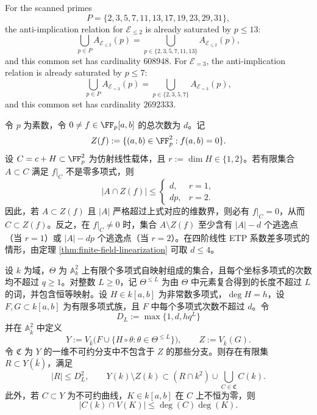 \begin{theorem}\label{thm:prime-field-saturation}
For the scanned primes
\[
    P=\{2,3,5,7,11,13,17,19,23,29,31\},
\]
the anti-implication relation for \({\mathcal E}_{\leq 2}\) is already
saturated by \(p\leq 13\):
\[
    \bigcup_{p\in P} A_{{\mathcal E}_{\leq 2}}(p)
    =
    \bigcup_{p\in\{2,3,5,7,11,13\}} A_{{\mathcal E}_{\leq 2}}(p),
\]
and this common set has cardinality \(608948\).  For
\({\mathcal E}_{=3}\), the anti-implication relation is already saturated by
\(p\leq 7\):
\[
    \bigcup_{p\in P} A_{{\mathcal E}_{=3}}(p)
    =
    \bigcup_{p\in\{2,3,5,7\}} A_{{\mathcal E}_{=3}}(p),
\]
and this common set has cardinality \(2692333\).
\end{theorem}
\begin{proposition}[系数平面载体的逃逸或陷落判据]\label{prop:distill-finite-field-carrier-escape-trap}
令 \(p\) 为素数，令 \(0\neq f\in\FF_p[a,b]\) 的总次数为 \(d\)。记
\[
Z(f):=\{(a,b)\in\FF_p^2:f(a,b)=0\}.
\]
设 \(C=c+H\subset\FF_p^2\) 为仿射线性载体，且 \(r:=\dim H\in\{1,2\}\)。若有限集合 \(A\subset C\) 满足 \(f|_C\) 不是零多项式，则
\[
|A\cap Z(f)|\leq
\begin{cases}
d,& r=1,\\
dp,& r=2.
\end{cases}
\]
因此，若 \(A\subset Z(f)\) 且 \(|A|\) 严格超过上式对应的维数界，则必有 \(f|_C=0\)，从而 \(C\subset Z(f)\)。反之，在 \(f|_C\neq 0\) 时，集合 \(A\setminus Z(f)\) 至少含有 \(|A|-d\) 个逃逸点（当 \(r=1\)）或 \(|A|-dp\) 个逃逸点（当 \(r=2\)）。在四阶线性 ETP 系数差多项式的情形，由定理 \ref{thm:finite-field-linearization} 可取 \(d\leq 4\)。
\end{proposition}
\begin{lemma}[系数平面的拉回逃逸骨架引理]\label{distill:breuillard_green_tao_approximate_groups_and_helfgott_growth-escape_and_algebraic_obstruction_control-coefficient-plane-pullback-bezout-skeleton}
设 \(k\) 为域，\(\Theta\) 为 \(\mathbb A^2_k\) 上有限个多项式自映射组成的集合，且每个坐标多项式的次数均不超过 \(q\ge 1\)。对整数 \(L\ge0\)，记 \(\Theta^{\le L}\) 为由 \(\Theta\) 中元素复合得到的长度不超过 \(L\) 的词，并包含恒等映射。设 \(H\in k[a,b]\) 为非常数多项式，\(\deg H=h\)，设 \(F,G\subset k[a,b]\) 为有限多项式族，且 \(F\) 中每个多项式次数不超过 \(d\)。令
\[
D_L:=\max\{1,d,hq^L\}
\]
并在 \(\mathbb A^2_{\bar k}\) 中定义
\[
Y:=V_{\bar k}\bigl(F\cup\{H\circ\theta:\theta\in\Theta^{\le L}\}\bigr),
\qquad
Z:=V_{\bar k}(G).
\]
令 \(\mathfrak C\) 为 \(Y\) 的一维不可约分支中不包含于 \(Z\) 的那些分支。则存在有限集 \(R\subset Y(\bar k)\)，满足
\[
|R|\le D_L^2,
\qquad
Y(k)\setminus Z(k)\subset (R\cap k^2)\cup\bigcup_{C\in\mathfrak C}C(k).
\]
此外，若 \(C\subset Y\) 为不可约曲线，\(K\in k[a,b]\) 在 \(C\) 上不恒为零，则
\[
|C(k)\cap V(K)|\le \deg(C)\deg(K).
\]
\end{lemma}
